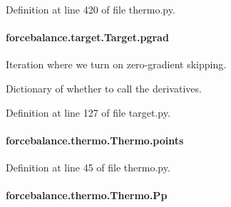 Definition at line 420 of file thermo.\-py.

\hypertarget{classforcebalance_1_1target_1_1Target_a684235b4332b608c4e2da22982c2fdfa}{
\paragraph[{pgrad}]{\setlength{\rightskip}{0pt plus 5cm}forcebalance.\-target.\-Target.\-pgrad\hspace{0.3cm}{\ttfamily [inherited]}}}\label{classforcebalance_1_1target_1_1Target_a684235b4332b608c4e2da22982c2fdfa}


Iteration where we turn on zero-\/gradient skipping. 

Dictionary of whether to call the derivatives. 

Definition at line 127 of file target.\-py.

\hypertarget{classforcebalance_1_1thermo_1_1Thermo_a026babae21684ddf5751cf17a91c5588}{
\paragraph[{points}]{\setlength{\rightskip}{0pt plus 5cm}forcebalance.\-thermo.\-Thermo.\-points\hspace{0.3cm}{\ttfamily [inherited]}}}\label{classforcebalance_1_1thermo_1_1Thermo_a026babae21684ddf5751cf17a91c5588}


Definition at line 45 of file thermo.\-py.

\hypertarget{classforcebalance_1_1thermo_1_1Thermo_a542d45d19d3ac48f3c7f25c00fd9d839}{
\paragraph[{Pp}]{\setlength{\rightskip}{0pt plus 5cm}forcebalance.\-thermo.\-Thermo.\-Pp\hspace{0.3cm}{\ttfamily [inherited]}}}\label{classforcebalance_1_1thermo_1_1Thermo_a542d45d19d3ac48f3c7f25c00fd9d839}


